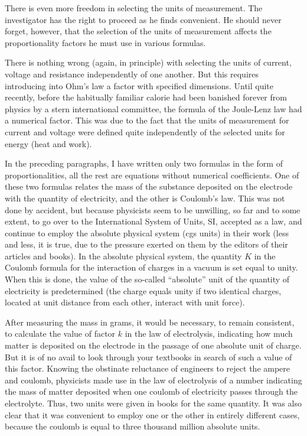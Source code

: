 There is even more freedom in selecting the units of measurement. The investigator has the right to proceed as he finds convenient. He should never forget, however, that the selection of the units of measurement affects the proportionality factors he must use in various formulas.

There is nothing wrong (again, in principle) with selecting the units of current, voltage and resistance independently of one another. But this requires introducing into Ohm's law a factor with specified dimensions. Until quite recently, before the habitually familiar calorie had been banished forever from physics by a stern international committee, the formula of the Joule-Lenz law had a numerical factor. This was due to the fact that the units of measurement for current and voltage were defined quite independently of the selected units for energy (heat and work).

In the preceding paragraphs, I have written only two formulas in the form of proportionalities, all the rest are equations without numerical coefficients. One of these two formulas relates the mass of the substance deposited on the electrode with the quantity of electricity, and the other is Coulomb's law. This was not done by accident, but because physicists seem to be unwilling, so far and to some extent, to go over to the International System of Units, SI, accepted as a law, and continue to employ the absolute physical system (cgs units) in their work (less and less, it is true, due to the pressure exerted on them by the editors of their articles and books). In the absolute physical system, the quantity $K$ in the Coulomb formula for the interaction of charges in a vacuum is set equal to unity. When this is done, the value of the so-called ``absolute'' unit of the quantity of electricity is predetermined (the charge equals unity if two identical charges, located at unit distance from each other, interact with unit force).

After measuring the mass in grams, it would be necessary, to remain consistent, to calculate the value of factor $k$ in the law of electrolysis, indicating how much matter is deposited on the electrode in the passage of one absolute unit of charge. But it is of no avail to look through your textbooks in search of such a value of this factor. Knowing the obstinate reluctance of engineers to reject the ampere and coulomb, physicists made use in the law of electrolysis of a number indicating the mass of matter deposited when one coulomb of electricity passes through the electrolyte. Thus, two units were given in books for the same quantity. It was also clear that it was convenient to employ one or the other in entirely different cases, because the coulomb is equal to three thousand million absolute units.

